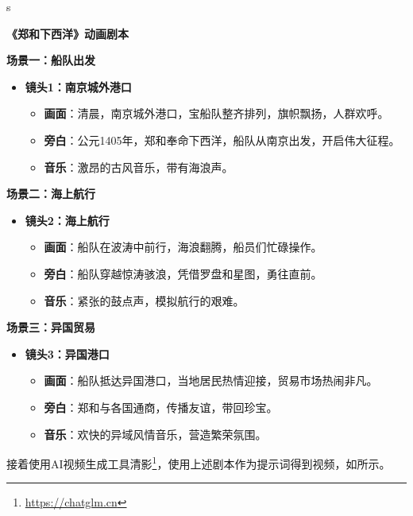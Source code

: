 \begin{gptbox}
s \footnotesize{
  \textbf{《郑和下西洋》动画剧本}

  \textbf{场景一：船队出发}
  \begin{itemize}
      \item \textbf{镜头1：南京城外港口}
      \begin{itemize}
          \item \textbf{画面}：清晨，南京城外港口，宝船队整齐排列，旗帜飘扬，人群欢呼。
          \item \textbf{旁白}：公元1405年，郑和奉命下西洋，船队从南京出发，开启伟大征程。
          \item \textbf{音乐}：激昂的古风音乐，带有海浪声。
      \end{itemize}
  \end{itemize}
  
  \textbf{场景二：海上航行}
  \begin{itemize}
      \item \textbf{镜头2：海上航行}
      \begin{itemize}
          \item \textbf{画面}：船队在波涛中前行，海浪翻腾，船员们忙碌操作。
          \item \textbf{旁白}：船队穿越惊涛骇浪，凭借罗盘和星图，勇往直前。
          \item \textbf{音乐}：紧张的鼓点声，模拟航行的艰难。
      \end{itemize}
  \end{itemize}
  
  \textbf{场景三：异国贸易}
  \begin{itemize}
      \item \textbf{镜头3：异国港口}
      \begin{itemize}
          \item \textbf{画面}：船队抵达异国港口，当地居民热情迎接，贸易市场热闹非凡。
          \item \textbf{旁白}：郑和与各国通商，传播友谊，带回珍宝。
          \item \textbf{音乐}：欢快的异域风情音乐，营造繁荣氛围。
      \end{itemize}
  \end{itemize}
}
\end{gptbox}


接着使用AI视频生成工具清影\footnote{\url{https://chatglm.cn}}，使用上述剧本作为提示词得到视频，如所示。

